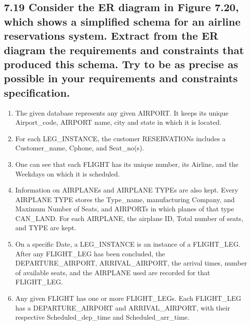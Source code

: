 \subsection*{7.19 Consider the ER diagram in Figure 7.20, which shows a simplified schema for an airline reservations system. Extract from the ER diagram the requirements and constraints that produced this schema. Try to be as precise as possible in your requirements and constraints specification.}
\begin{enumerate}
\item The given database represents any given AIRPORT. It keeps its unique Airport\_code, AIRPORT name, city and state in which it is located.
\item For each LEG\_INSTANCE, the customer RESERVATIONs includes a Customer\_name, Cphone, and Seat\_no(s).\item One can see that each FLIGHT has its unique number, its Airline, and the Weekdays on which it is scheduled.
\item Information on AIRPLANEs and AIRPLANE TYPEs are also kept. Every AIRPLANE TYPE stores the Type\_name, manufacturing Company, and Maximum Number of Seats, and AIRPORTs in which planes of that type CAN\_LAND. For each AIRPLANE, the airplane ID, Total number of seats, and TYPE are kept.
\item On a specific Date, a LEG\_INSTANCE is an instance of a FLIGHT\_LEG. After any FLIGHT\_LEG has been concluded, the DEPARTURE\_AIRPORT, ARRIVAL\_AIRPORT, the arrival times, number of available seats, and the AIRPLANE used are recorded for that FLIGHT\_LEG.
\item Any given FLIGHT has one or more FLIGHT\_LEGs. Each FLIGHT\_LEG has a DEPARTURE\_AIRPORT and ARRIVAL\_AIRPORT, with their respective Scheduled\_dep\_time and Scheduled\_arr\_time.
\end{enumerate}
